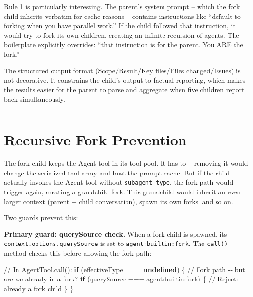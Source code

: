 \documentclass[
  english,
  11pt,
  letterpaper,
]{book}
\newenvironment{Shaded}{\begin{snugshade}}{\end{snugshade}}
\newcommand{\CommentTok}[1]{\textcolor[rgb]{0.37,0.37,0.37}{#1}}
\newcommand{\ControlFlowTok}[1]{\textcolor[rgb]{0.00,0.23,0.31}{\textbf{#1}}}
\newcommand{\KeywordTok}[1]{\textcolor[rgb]{0.00,0.23,0.31}{\textbf{#1}}}
\newcommand{\NormalTok}[1]{\textcolor[rgb]{0.00,0.23,0.31}{#1}}
\newcommand{\OperatorTok}[1]{\textcolor[rgb]{0.37,0.37,0.37}{#1}}
\newcommand{\StringTok}[1]{\textcolor[rgb]{0.13,0.47,0.30}{#1}}
\begin{document}
Rule 1 is particularly interesting. The parent's system prompt -- which
the fork child inherits verbatim for cache reasons -- contains
instructions like ``default to forking when you have parallel work.'' If
the child followed that instruction, it would try to fork its own
children, creating an infinite recursion of agents. The boilerplate
explicitly overrides: ``that instruction is for the parent. You ARE the
fork.''

The structured output format (Scope/Result/Key files/Files
changed/Issues) is not decorative. It constrains the child's output to
factual reporting, which makes the results easier for the parent to
parse and aggregate when five children report back simultaneously.

\begin{center}\rule{0.5\linewidth}{0.5pt}\end{center}

\section{Recursive Fork Prevention}\label{recursive-fork-prevention}

The fork child keeps the Agent tool in its tool pool. It has to --
removing it would change the serialized tool array and bust the prompt
cache. But if the child actually invokes the Agent tool without
\texttt{subagent\_type}, the fork path would trigger again, creating a
grandchild fork. This grandchild would inherit an even larger context
(parent + child conversation), spawn its own forks, and so on.

Two guards prevent this:

\textbf{Primary guard: querySource check.} When a fork child is spawned,
its \texttt{context.options.querySource} is set to
\texttt{\textquotesingle{}agent:builtin:fork\textquotesingle{}}. The
\texttt{call()} method checks this before allowing the fork path:

\begin{Shaded}
\begin{Highlighting}[]
\CommentTok{// In AgentTool.call():}
\ControlFlowTok{if}\NormalTok{ (effectiveType }\OperatorTok{===} \KeywordTok{undefined}\NormalTok{) \{}
  \CommentTok{// Fork path {-}{-} but are we already in a fork?}
  \ControlFlowTok{if}\NormalTok{ (querySource }\OperatorTok{===} \StringTok{\textquotesingle{}agent:builtin:fork\textquotesingle{}}\NormalTok{) \{}
    \CommentTok{// Reject: already a fork child}
\NormalTok{  \}}
\NormalTok{\}}
\end{Highlighting}
\end{Shaded}
\end{document}
